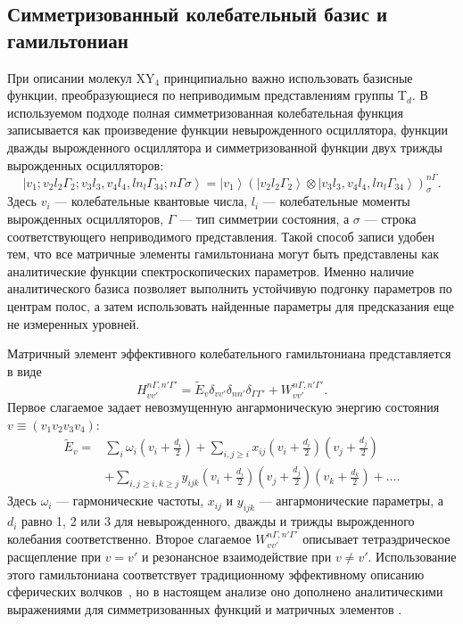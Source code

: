 \subsection{Симметризованный колебательный базис и гамильтониан}

При описании молекул XY$_4$ принципиально важно использовать базисные функции, преобразующиеся по
неприводимым представлениям группы T$_d$. В используемом подходе полная симметризованная
колебательная функция записывается как произведение функции невырожденного осциллятора, функции
дважды вырожденного осциллятора и симметризованной функции двух трижды вырожденных осцилляторов:
\begin{equation}
\left| v_1;v_2l_2\Gamma_2;v_3l_3,v_4l_4,l n_l\Gamma_{34};n\Gamma\sigma\right\rangle=
\left|v_1\right\rangle
\left(\left|v_2l_2\Gamma_2\right\rangle\otimes
\left|v_3l_3,v_4l_4,l n_l\Gamma_{34}\right\rangle\right)^{n\Gamma}_{\sigma}.
\label{eq:ge_basis_function}
\end{equation}
Здесь $v_i$ --- колебательные квантовые числа, $l_i$ --- колебательные моменты вырожденных
осцилляторов, $\Gamma$ --- тип симметрии состояния, а $\sigma$ --- строка соответствующего
неприводимого представления. Такой способ записи удобен тем, что все матричные элементы
гамильтониана могут быть представлены как аналитические функции спектроскопических параметров.
Именно наличие аналитического базиса позволяет выполнить устойчивую подгонку параметров по центрам
полос, а затем использовать найденные параметры для предсказания еще не измеренных уровней.

Матричный элемент эффективного колебательного гамильтониана представляется в виде
\begin{equation}
H_{vv'}^{n\Gamma,n'\Gamma'}=\widetilde{E}_{v}\delta_{vv'}\delta_{nn'}\delta_{\Gamma\Gamma'}+
W_{vv'}^{n\Gamma,n'\Gamma'}.
\label{eq:ge_hamiltonian_matrix}
\end{equation}
Первое слагаемое задает невозмущенную ангармоническую энергию состояния
$v\equiv(v_1v_2v_3v_4)$:
\begin{equation}
\begin{aligned}
\widetilde{E}_{v}={}&
\sum_i\omega_i\left(v_i+\frac{d_i}{2}\right)+
\sum_{i,j\geq i}x_{ij}\left(v_i+\frac{d_i}{2}\right)
\left(v_j+\frac{d_j}{2}\right) \\
&+\sum_{i,j\geq i,k\geq j}y_{ijk}
\left(v_i+\frac{d_i}{2}\right)
\left(v_j+\frac{d_j}{2}\right)
\left(v_k+\frac{d_k}{2}\right)+\ldots .
\end{aligned}
\label{eq:ge_unperturbed_energy}
\end{equation}
Здесь $\omega_i$ --- гармонические частоты, $x_{ij}$ и $y_{ijk}$ --- ангармонические параметры,
а $d_i$ равно 1, 2 или 3 для невырожденного, дважды и трижды вырожденного колебания соответственно.
Второе слагаемое $W_{vv'}^{n\Gamma,n'\Gamma'}$ описывает тетраэдрическое расщепление при $v=v'$ и
резонансное взаимодействие при $v\neq v'$. Использование этого гамильтониана соответствует
традиционному эффективному описанию сферических волчков~\cite{hecht,nielsen}, но в настоящем анализе
оно дополнено аналитическими выражениями для симметризованных функций и матричных элементов
\cite{ulen1,ulen2}.

